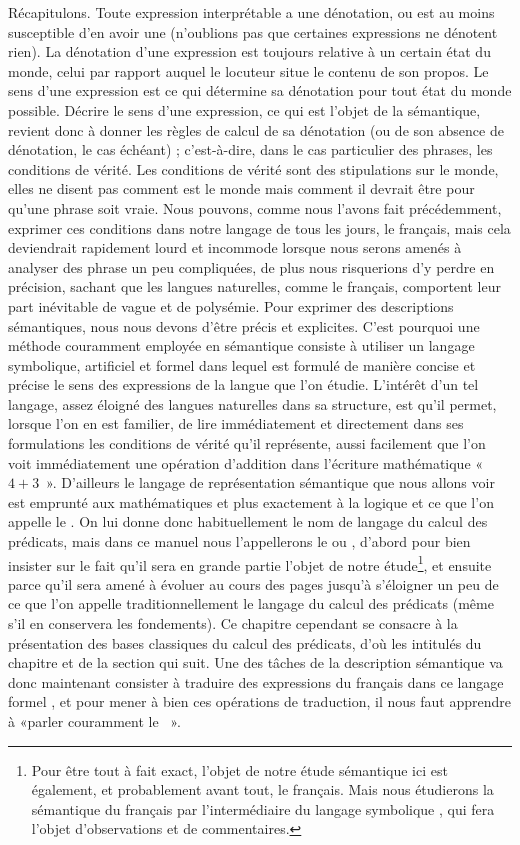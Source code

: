 Récapitulons. Toute expression interprétable a une dénotation, ou est
au moins susceptible d'en avoir une (n'oublions pas que certaines
expressions ne dénotent rien).  La dénotation d'une expression est
toujours relative à un certain état du monde, celui par rapport auquel
le locuteur situe le contenu de son propos.  Le sens d'une expression
est ce qui détermine sa dénotation pour tout état du monde possible.
Décrire le sens d'une expression, ce qui est l'objet de la sémantique,
revient donc à donner les règles de calcul de sa dénotation (ou de son
absence de dénotation, le cas échéant) ; c'est-à-dire, dans le cas
particulier des phrases, les conditions de vérité.  Les conditions de
vérité sont des stipulations sur le monde, elles ne disent pas comment
est le monde mais comment il devrait être pour qu'une phrase soit
vraie.  Nous pouvons, comme nous l'avons fait précédemment, exprimer ces
conditions dans notre langage de tous les jours, le français, mais
cela deviendrait rapidement lourd et incommode lorsque nous serons amenés
à analyser des phrase un peu compliquées, de plus nous risquerions d'y
perdre en précision, sachant que les langues naturelles, comme le
français, comportent leur part inévitable de vague et de polysémie.
Pour exprimer des descriptions sémantiques, nous nous devons d'être
précis et explicites.  C'est pourquoi une méthode couramment employée
en sémantique consiste à utiliser un langage symbolique, artificiel et
formel dans lequel est formulé de manière concise et précise le sens
des expressions de la langue que l'on étudie.  L'intérêt d'un tel
langage, assez éloigné des langues naturelles dans sa structure, est
qu'il permet, lorsque l'on en est familier, de lire immédiatement et
directement dans ses formulations les conditions de vérité qu'il
représente, aussi facilement que l'on voit immédiatement une opération
d'addition dans l'écriture mathématique «~$4+3$~».  D'ailleurs le
langage de représentation sémantique que nous allons voir est emprunté
aux mathématiques et plus exactement à la logique et ce que l'on
appelle le .  On lui donne donc
habituellement le nom de langage du calcul des prédicats, mais dans ce
manuel nous l'appellerons le  ou {\LO}, d'abord pour
bien insister sur le fait qu'il sera en grande partie l'objet de notre
étude\footnote{Pour être tout à fait exact, l'objet de notre étude
sémantique ici est également, et probablement avant tout, le français.
Mais nous étudierons la sémantique du français par l'intermédiaire du
langage symbolique \LO, qui fera l'objet d'observations et de
commentaires.}, et ensuite parce qu'il sera amené à évoluer au cours
des pages jusqu'à s'éloigner un peu de ce que l'on appelle
traditionnellement le langage du calcul des prédicats (même s'il en
conservera les fondements).  Ce chapitre cependant se consacre à la
présentation des bases classiques du calcul des prédicats, d'où les
intitulés du chapitre et de la section qui suit. Une des tâches de la
description sémantique va donc maintenant consister à traduire des
expressions du français dans ce langage formel {\LO}, et pour mener à
bien ces opérations de traduction, il nous faut apprendre à «parler
couramment le {\LO}~».


